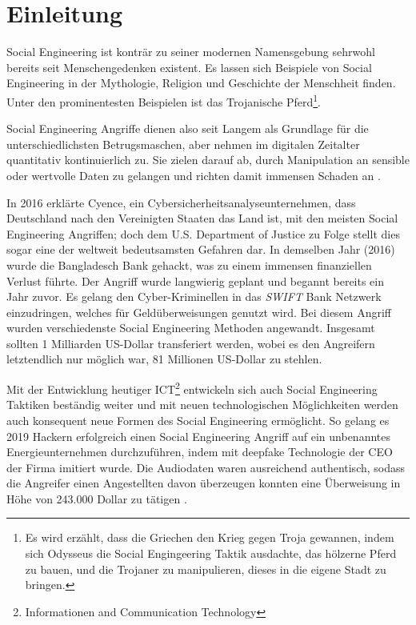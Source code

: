 \chapter{Einleitung}
\label{chapter:einleitung}

Social Engineering ist konträr zu seiner modernen Namensgebung sehrwohl bereits seit
Menschengedenken existent. Es lassen sich Beispiele von Social Engineering in der Mythologie,
Religion und Geschichte der Menschheit finden.
Unter den prominentesten Beispielen ist das Trojanische Pferd\footnote{Es wird erzählt, dass
die Griechen den Krieg gegen Troja gewannen,
indem sich Odysseus die Social Engingeering Taktik ausdachte, das hölzerne Pferd zu bauen,
und die Trojaner zu manipulieren, dieses in die eigene Stadt zu bringen.}.

Social Engineering Angriffe dienen also seit Langem als Grundlage für die unterschiedlichsten Betrugsmaschen,
aber nehmen im digitalen Zeitalter quantitativ kontinuierlich zu.
Sie zielen darauf ab, durch Manipulation an sensible oder wertvolle Daten zu gelangen
und richten damit immensen Schaden an .

In 2016 erklärte Cyence, ein Cybersicherheitsanalyseunternehmen, dass Deutschland nach den Vereinigten Staaten
das Land ist, mit den meisten Social Engineering Angriffen; doch dem U.S. Department of Justice zu Folge stellt
dies sogar eine der weltweit bedeutsamsten Gefahren dar.
In demselben Jahr (2016) wurde die Bangladesch Bank gehackt, was zu einem immensen finanziellen Verlust führte.
Der Angriff wurde langwierig geplant und begannt bereits ein Jahr zuvor.
Es gelang den Cyber-Kriminellen in das \textit{SWIFT} Bank Netzwerk einzudringen, welches für Geldüberweisungen
genutzt wird. Bei diesem Angriff wurden verschiedenste Social Engineering Methoden angewandt.
Insgesamt sollten 1 Milliarden US-Dollar transferiert werden, wobei es den Angreifern
letztendlich nur möglich war, 81 Millionen US-Dollar zu stehlen.

Mit der Entwicklung heutiger ICT\footnote{Informationen and Communication Technology} entwickeln sich auch
Social Engineering Taktiken beständig weiter und mit neuen technologischen Möglichkeiten werden auch
konsequent neue Formen des Social Engineering ermöglicht.
So gelang es 2019 Hackern erfolgreich einen Social Engineering Angriff auf ein unbenanntes Energieunternehmen
durchzuführen, indem mit deepfake Technologie der CEO der Firma imitiert wurde. Die Audiodaten waren ausreichend
authentisch, sodass die Angreifer einen Angestellten davon überzeugen konnten eine Überweisung in Höhe von
243.000 Dollar zu tätigen .


